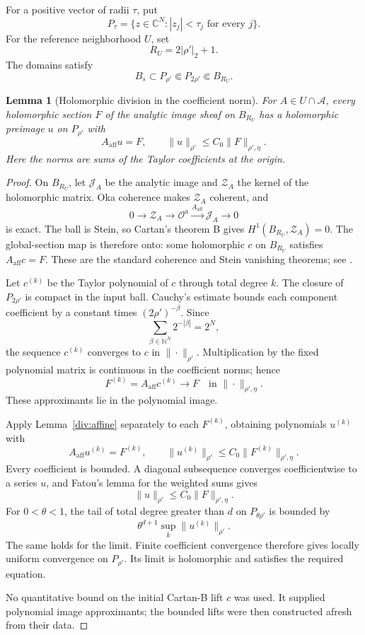 \documentclass[11pt,reqno]{amsart}
\numberwithin{equation}{section}
\newtheorem{lemma}[theorem]{Lemma}
\theoremstyle{definition}
\theoremstyle{remark}
\begin{document}
For a positive vector of radii \(\tau\), put
\[
 P_\tau=\{z\in\mathbb C^N:|z_j|<\tau_j\text{ for every }j\}.
\]
For the reference neighborhood \(U\), set
\[
 R_U=2|\rho'|_2+1.
\]
The domains satisfy
\[
 B_s\subset P_{\rho'}\Subset P_{2\rho'}\Subset B_{R_U}.
\]

\begin{lemma}[Holomorphic division in the coefficient norm]
\label{div:holomorphic}
For \(A\in U\cap\mathcal A\), every holomorphic section \(F\) of
the analytic image sheaf on \(B_{R_U}\) has a holomorphic preimage
\(u\) on \(P_{\rho'}\) with
\[
 A_{\mathrm{aff}}u=F,\qquad
 \|u\|_{\rho'}\leq C_0\|F\|_{\rho',\eta}.
 \]
Here the norms are sums of the Taylor coefficients at the origin.
\end{lemma}

\begin{proof}
On \(B_{R_U}\), let \(\mathscr J_A\) be the analytic image and
\(\mathscr Z_A\) the kernel of the holomorphic matrix. Oka
coherence makes \(\mathscr Z_A\) coherent, and
\[
 0\longrightarrow\mathscr Z_A\longrightarrow\mathcal O^a
 \xrightarrow{A_{\mathrm{aff}}}\mathscr J_A
 \longrightarrow0
\]
is exact. The ball is Stein, so Cartan's theorem B gives
\(H^1(B_{R_U},\mathscr Z_A)=0\). The global-section map is
therefore onto: some holomorphic \(c\) on \(B_{R_U}\) satisfies
\(A_{\mathrm{aff}}c=F\). These are the standard coherence and
Stein vanishing theorems; see \cite{GrauertRemmert}.

Let \(c^{(k)}\) be the Taylor polynomial of \(c\) through total
degree \(k\). The closure of \(P_{2\rho'}\) is compact in the
input ball. Cauchy's estimate bounds each component coefficient
by a constant times \((2\rho')^{-\beta}\). Since
\[
 \sum_{\beta\in\mathbb N^N}2^{-|\beta|}=2^N,
\]
the sequence \(c^{(k)}\) converges to \(c\) in
\(\|\cdot\|_{\rho'}\). Multiplication by the fixed polynomial
matrix is continuous in the coefficient norms; hence
\[
 F^{(k)}=A_{\mathrm{aff}}c^{(k)}
 \longrightarrow F
 \quad\text{in }\|\cdot\|_{\rho',\eta}.
\]
These approximants lie in the polynomial image.

Apply Lemma~\ref{div:affine} separately to each \(F^{(k)}\),
obtaining polynomials \(u^{(k)}\) with
\[
 A_{\mathrm{aff}}u^{(k)}=F^{(k)},\qquad
 \|u^{(k)}\|_{\rho'}\leq C_0\|F^{(k)}\|_{\rho',\eta}.
\]
Every coefficient is bounded. A diagonal subsequence converges
coefficientwise to a series \(u\), and Fatou's lemma for the
weighted sums gives
\[
 \|u\|_{\rho'}\leq C_0\|F\|_{\rho',\eta}.
\]
For \(0<\theta<1\), the tail of total degree greater than \(d\)
on \(P_{\theta\rho'}\) is bounded by
\[
 \theta^{d+1}\sup_k\|u^{(k)}\|_{\rho'}.
\]
The same holds for the limit. Finite coefficient convergence
therefore gives locally uniform convergence on \(P_{\rho'}\).
Its limit is holomorphic and satisfies the required equation.

No quantitative bound on the initial Cartan-B lift \(c\) was
used. It supplied polynomial image approximants; the bounded
lifts were then constructed afresh from their data.
\end{proof}
\end{document}
